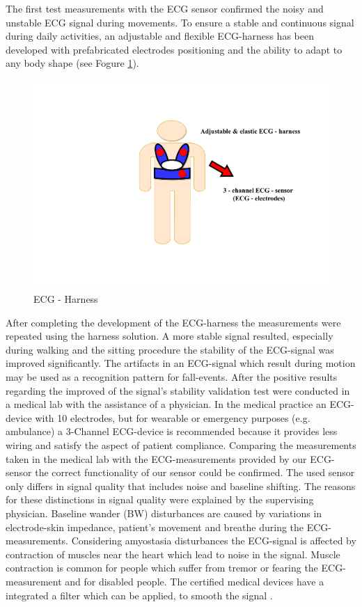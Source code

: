 \documentclass[review]{elsarticle}
\begin{document}
The first test measurements with the ECG sensor confirmed the noisy and unstable ECG signal during movements. To ensure a stable and continuous signal during daily activities, an adjustable and flexible ECG-harness has been developed with prefabricated electrodes positioning and the ability to adapt to any body shape (see Fogure \ref{fig:ECGHarness}).
\begin{figure}[!ht]
	\centering
	\includegraphics[scale=0.39]{images/ECG-Harness}
	\caption[ECG - Harness]{ECG - Harness}
	\label{fig:ECGHarness}
\end{figure}
After completing the development of the ECG-harness the measurements were repeated using the harness solution. A more stable signal resulted, especially during walking and the sitting procedure the stability of the ECG-signal was improved significantly. The artifacts in an ECG-signal which result during motion may be used as a recognition pattern for fall-events. After the positive results regarding the improved of the signal's stability validation test were conducted in a medical lab with the assistance of a physician. In the medical practice an ECG-device with 10 electrodes, but for wearable or emergency purposes (e.g. ambulance) a 3-Channel ECG-device is recommended because it provides less wiring and satisfy the aspect of patient compliance. Comparing the measurements taken in the medical lab with the ECG-measurements provided by our ECG-sensor the correct functionality of our sensor could be confirmed. The used sensor only differs in signal quality that includes noise and baseline shifting. The reasons for these distinctions in signal quality were explained by the supervising physician. Baseline wander (BW) disturbances are caused by variations in electrode-skin impedance, patient's movement and breathe during the ECG-measurements. Considering amyostasia disturbances the ECG-signal is affected by contraction of muscles near the heart which lead to noise in the signal. Muscle contraction is common for people which suffer from tremor or fearing the ECG-measurement and for disabled people. The certified medical devices have a integrated a filter which can be applied, to smooth the signal \cite{ECGNoise,DrNicoletteWagner}. 
\end{document}
